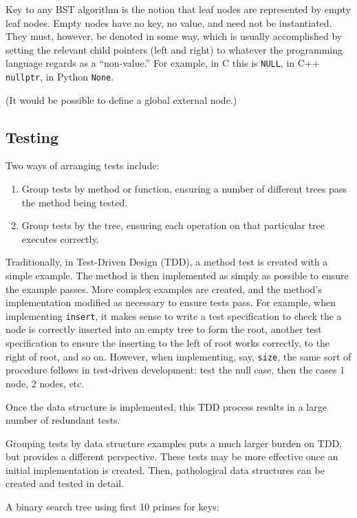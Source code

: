 \documentclass{article}
\begin{document}
Key to any BST algorithm is the notion that leaf nodes are represented
by empty leaf nodes. Empty nodes have no key, no value, and need not be
instantiated. They must, however, be denoted in some way, which is
usually accomplished by setting the relevant child pointers (left and
right) to whatever the programming language regards as a ``non-value.''
For example, in C this is {\tt NULL}, in C++ {\tt nullptr}, in Python {\tt None}.

(It would be possible to define a global external node.)

\subsection{Testing}

Two ways of arranging tests include:
\begin{enumerate}
\item Group tests by method or function, ensuring a number of different
trees pass the method being tested.
\item Group tests by the tree, ensuring each operation on that particular tree
executes correctly.
\end{enumerate}

Traditionally, in Test-Driven Design (TDD), a method test is created with a simple example.
The method is then implemented as simply as possible to ensure the example passes.
More complex examples are created, and the method's implementation modified as necessary
to ensure tests pass. For example, when implementing {\tt insert}, it makes sense
to write a test specification to check the a node is correctly inserted into an
empty tree to form the root, another test specification to ensure the inserting
to the left of root works correctly, to the right of root, and so on. However,
when implementing, say, {\tt size}, the same sort of procedure follows in test-driven
development: test the null case, then the cases 1 node, 2 nodes, etc.

Once the data structure is implemented, this TDD process results in a large number
of redundant tests.

Grouping tests by data structure examples puts a much larger burden on TDD,
but provides a different perspective. These tests may be more effective once an
initial implementation is created. Then, pathological data structures can be
created and tested in detail.


A binary search tree using first 10 primes for keys:

\end{document}
